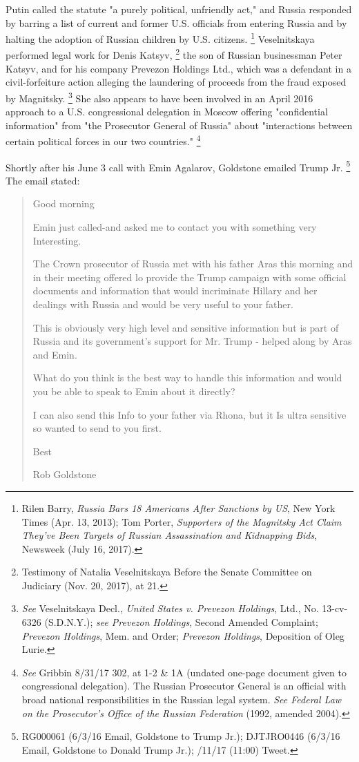 Putin called the statute "a purely political, unfriendly act," and Russia responded by barring a list of current and former U.S. officials from entering Russia and by halting the adoption of Russian children by U.S. citizens.%
\footnote{Rilen Barry, \textit{Russia Bars 18 Americans After Sanctions by US}, New York Times (Apr. 13, 2013);
Tom Porter, \textit{Supporters of the Magnitsky Act Claim They’ve Been Targets of Russian Assassination and Kidnapping Bids}, Newsweek (July 16, 2017).}
Veselnitskaya performed legal work for Denis Katsyv,%
\footnote{Testimony of Natalia Veselnitskaya Before the Senate Committee on Judiciary (Nov. 20, 2017), at 21.}
the son of Russian businessman Peter Katsyv, and for his company Prevezon Holdings Ltd., which was a defendant in a civil-forfeiture action alleging the laundering of proceeds from the fraud exposed by Magnitsky.%
\footnote{\textit{See} Veselnitskaya Decl., \textit{United States v. Prevezon Holdings}, Ltd., No. 13-cv-6326 (S.D.N.Y.);
\textit{see Prevezon Holdings}, Second Amended Complaint;
\textit{Prevezon Holdings}, Mem. and Order;
\textit{Prevezon Holdings}, Deposition of Oleg Lurie.}
She also appears to have been involved in an April 2016 approach to a U.S. congressional delegation in Moscow offering "confidential information" from "the Prosecutor General of Russia" about "interactions between certain political forces in our two countries."%
\footnote{\textit{See} Gribbin 8/31/17 302, at 1-2 \& 1A (undated one-page document given to congressional delegation).
The Russian Prosecutor General is an official with broad national responsibilities in the Russian legal system.
\textit{See Federal Law on the Prosecutor's Office of the Russian Federation} (1992, amended 2004).}

Shortly after his June 3 call with Emin Agalarov, Goldstone emailed Trump Jr.%
\footnote{RG000061 (6/3/16 Email, Goldstone to Trump Jr.);
DJTJRO0446 (6/3/16 Email, Goldstone to Donald Trump Jr.);
/11/17 (11:00) Tweet.}
The email stated:

\begin{quote}
Good morning

Emin just called-and asked me to contact you with something very Interesting.

The Crown prosecutor of Russia met with his father Aras this morning and in their meeting offered lo provide the Trump campaign with some official documents and information that would incriminate Hillary and her dealings with Russia and would be very useful to your father.

This is obviously very high level and sensitive information but is part of Russia and its government's support for Mr. Trump - helped along by Aras and Emin.

What do you think is the best way to handle this information and would you be able to speak to Emin about it directly?

I can also send this Info to your father via Rhona, but it Is ultra sensitive so wanted to send to you first.

Best

Rob Goldstone
\end{quote}

